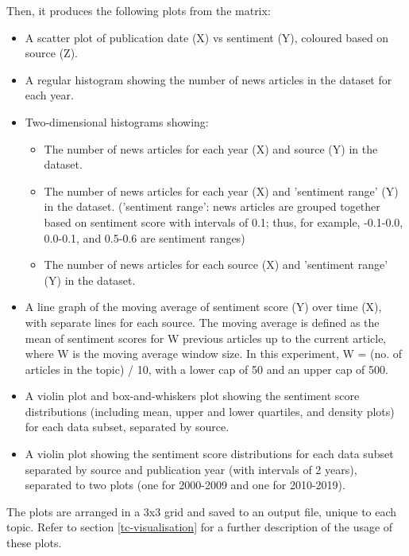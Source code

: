 \documentclass{report}
\begin{document}
Then, it produces the following plots from the matrix:
\begin{itemize}
	\item A scatter plot of publication date (X) vs sentiment (Y), coloured based on source (Z).
	\item A regular histogram showing the number of news articles in the dataset for each year.
	\item Two-dimensional histograms showing:
		\begin{itemize}
			\item The number of news articles for each year (X) and source (Y) in the dataset.
			\item The number of news articles for each year (X) and 'sentiment range' (Y) in the dataset.
			('sentiment range': news articles are grouped together based on sentiment score with intervals of 0.1; thus, for example, -0.1-0.0, 0.0-0.1, and 0.5-0.6 are sentiment ranges)
			\item The number of news articles for each source (X) and 'sentiment range' (Y) in the dataset.
		\end{itemize}
	\item A line graph of the moving average of sentiment score (Y) over time (X), with separate lines for each source.
		The moving average is defined as the mean of sentiment scores for W previous articles up to the current article, where W is the moving average window size.
		In this experiment, W = (no. of articles in the topic) / 10, with a lower cap of 50 and an upper cap of 500.
	\item A violin plot \cite{hintze1998violin} and box-and-whiskers plot \cite{tukey1977exploratory} showing the sentiment score distributions (including mean, upper and lower quartiles, and density plots) for each data subset, separated by source.
	\item A violin plot showing the sentiment score distributions for each data subset separated by source and publication year (with intervals of 2 years), separated to two plots (one for 2000-2009 and one for 2010-2019).
\end{itemize}
The plots are arranged in a 3x3 grid and saved to an output file, unique to each topic. 
Refer to section \ref{tc-visualisation} for a further description of the usage of these plots.
\end{document}
